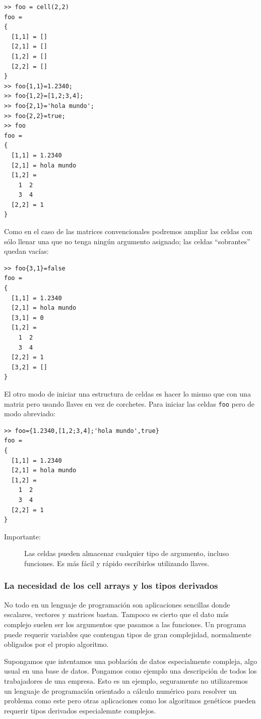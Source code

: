 \begin{lstlisting}
>> foo = cell(2,2)
foo =
{
  [1,1] = []
  [2,1] = []
  [1,2] = []
  [2,2] = []
}
>> foo{1,1}=1.2340;
>> foo{1,2}=[1,2;3,4];
>> foo{2,1}='hola mundo';
>> foo{2,2}=true;
>> foo
foo =
{
  [1,1] = 1.2340
  [2,1] = hola mundo
  [1,2] =
    1  2
    3  4
  [2,2] = 1
}
\end{lstlisting}
Como en el caso de las matrices convencionales podremos ampliar las
celdas con sólo llenar una que no tenga ningún argumento asignado; las
celdas {}``sobrantes'' quedan vacías:

\begin{lstlisting}
>> foo{3,1}=false
foo =
{
  [1,1] = 1.2340
  [2,1] = hola mundo
  [3,1] = 0
  [1,2] =
    1  2
    3  4
  [2,2] = 1
  [3,2] = []
}
\end{lstlisting}
El otro modo de iniciar una estructura de celdas es hacer lo mismo que
con una matriz pero usando llaves en vez de corchetes. Para iniciar
las celdas \texttt{foo} pero de modo abreviado:

\begin{lstlisting}
>> foo={1.2340,[1,2;3,4];'hola mundo',true}
foo =
{
  [1,1] = 1.2340
  [2,1] = hola mundo
  [1,2] =
    1  2
    3  4
  [2,2] = 1
}
\end{lstlisting}
\begin{description}
\item [Importante:]Las celdas pueden almacenar cualquier tipo de
  argumento, incluso funciones. Es más fácil y rápido escribirlos
  utilizando llaves.
\end{description}

\subsubsection{La necesidad de los cell arrays y los tipos derivados}
No todo en un lenguaje de programación son aplicaciones sencillas
donde escalares, vectores y matrices bastan.  Tampoco es cierto que
el dato más complejo suelen ser los argumentos que pasamos a las
funciones.  Un programa puede requerir variables que contengan tipos
de gran complejidad, normalmente obligados por el propio algoritmo.

Supongamos que intentamos una población de datos especialmente compleja,
algo usual en una base de datos.  Pongamos como ejemplo una descripción
de todos los trabajadores de una empresa.  Esto es un ejemplo, seguramente
no utilizaremos un lenguaje de programación orientado a cálculo numérico
para resolver un problema como este pero otras aplicaciones como los
algoritmos genéticos pueden requerir tipos derivados especialemnte complejos.

